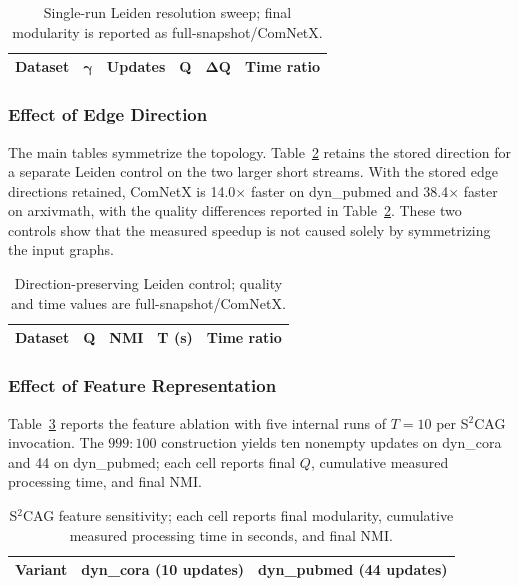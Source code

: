 \documentclass{ieeeaccess}
\begin{document}
\begin{table}[t]
\centering
\caption{Single-run Leiden resolution sweep; final modularity is reported as
full-snapshot/ComNetX.}
\label{tab:gamma}
\setlength{\tabcolsep}{5.0pt}
\small
\begin{tabular}{@{}lrrrrr@{}}
\toprule
\textbf{Dataset} & $\bm{\gamma}$ & \textbf{Updates} &
\textbf{Q} & $\bm{\Delta Q}$ & \textbf{Time ratio} \\
\midrule

\end{tabular}
\end{table}

\subsubsection{Effect of Edge Direction}
The main tables symmetrize the topology. Table~\ref{tab:directed} retains the
stored direction for a separate Leiden control on the two larger short streams.
With the stored edge directions retained, ComNetX is 14.0$\times$ faster on
dyn\_pubmed and 38.4$\times$ faster on arxivmath, with the quality differences
reported in Table~\ref{tab:directed}. These two controls show that the measured
speedup is not caused solely by symmetrizing the input graphs.

\begin{table}[t]
\centering
\caption{Direction-preserving Leiden control; quality and time values are
full-snapshot/ComNetX.}
\label{tab:directed}
\setlength{\tabcolsep}{5.0pt}
\small
\begin{tabular}{@{}lrrrr@{}}
\toprule
\textbf{Dataset} & \textbf{Q} & \textbf{NMI} &
\textbf{T (s)} & \textbf{Time ratio} \\
\midrule

\end{tabular}
\end{table}

\subsubsection{Effect of Feature Representation}
Table~\ref{tab:features} reports the feature ablation with five internal runs
of $T=10$ per S$^2$CAG invocation. The $999{:}100$ construction yields ten
nonempty updates on dyn\_cora and 44 on dyn\_pubmed; each cell reports final
$Q$, cumulative measured processing time, and final NMI.

\begin{table}[t]
\centering
\caption{S$^2$CAG feature sensitivity; each cell reports final modularity,
cumulative measured processing time in seconds, and final NMI.}
\label{tab:features}
\setlength{\tabcolsep}{5.0pt}
\small
\begin{tabular}{@{}lcc@{}}
\toprule
\textbf{Variant} & \textbf{dyn\_cora (10 updates)} &
\textbf{dyn\_pubmed (44 updates)} \\
\midrule

\end{tabular}
\end{table}
\end{document}
